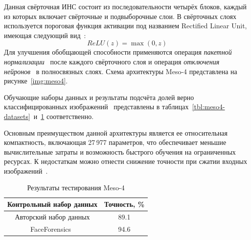 Данная свёрточная ИНС состоит из последовательности четырёх блоков, каждый из которых включает свёрточные и подвыборочные слои. В свёрточных слоях используется пороговая функция активации под названием Rectified Linear Unit, имеющая следующий вид~\cite{relu}:
\begin{equation}
	ReLU(z) = \max(0,z)
\end{equation}
Для улучшения обобщающей способности применяются операция \textit{пакетной нормализации}~\cite{batch} после каждого свёрточного слоя и операция \textit{отключения нейронов}~\cite{dropout} в полносвязных слоях. Схема архитектуры Meso-4 представлена на рисунке~\ref{img:meso4}.

Обучающие наборы данных и результаты подсчёта долей верно классифицированных изображений~\cite{meso4} представлены в таблицах~\ref{tbl:meso4-datasets}~и~\ref{tbl:meso4-results} соответственно.

Основным преимуществом данной архитектуры является ее относительная компактность, включающая 27\,977 параметров, что обеспечивает меньшие вычислительные затраты и возможность быстрого обучения на ограниченных ресурсах. К недостаткам можно отнести снижение точности при сжатии входных изображений~\cite{meso4}.

\begin{table}[H]
	\centering
	\caption{Результаты тестирования Meso-4}
	\label{tbl:meso4-results}
	\begin{tabular}{|c|c|}
		\hline
		\textbf{Контрольный набор данных} & \textbf{Точность, \%} \\
		\hline
		Авторский набор данных  & 89.1 \\
		\hline
		FaceForensics~\cite{faceforensics} & 94.6 \\
		\hline
	\end{tabular}
\end{table}

